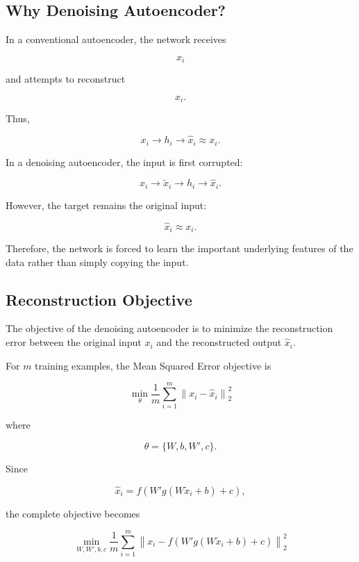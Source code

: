 \documentclass{article}
\begin{document}
\subsection{Why Denoising Autoencoder?}

In a conventional autoencoder, the network receives

\[
x_i
\]

and attempts to reconstruct

\[
x_i.
\]

Thus,

\[
x_i
\longrightarrow
h_i
\longrightarrow
\widehat{x}_i
\approx x_i.
\]

In a denoising autoencoder, the input is first corrupted:

\[
x_i
\longrightarrow
\widetilde{x}_i
\longrightarrow
h_i
\longrightarrow
\widehat{x}_i.
\]

However, the target remains the original input:

\[
\boxed{
	\widehat{x}_i
	\approx
	x_i.
}
\]

Therefore, the network is forced to learn the important underlying
features of the data rather than simply copying the input.

\subsection{Reconstruction Objective}

The objective of the denoising autoencoder is to minimize the
reconstruction error between the original input \(x_i\) and the
reconstructed output \(\widehat{x}_i\).

For \(m\) training examples, the Mean Squared Error objective is

\[
\boxed{
	\min_{\theta}
	\frac{1}{m}
	\sum_{i=1}^{m}
	\left\|
	x_i-\widehat{x}_i
	\right\|_2^2
}
\]

where

\[
\theta=\{W,b,W',c\}.
\]

Since

\[
\widehat{x}_i
=
f\left(
W'g(W\widetilde{x}_i+b)+c
\right),
\]

the complete objective becomes

\[
\boxed{
	\min_{W,W',b,c}
	\frac{1}{m}
	\sum_{i=1}^{m}
	\left\|
	x_i-
	f\left(
	W'g(W\widetilde{x}_i+b)+c
	\right)
	\right\|_2^2
}
\]
\end{document}
